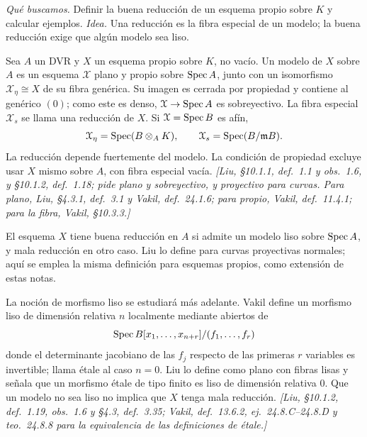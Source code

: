 \emph{Qué buscamos.} Definir la buena reducción de un esquema propio sobre $K$ y calcular ejemplos. \emph{Idea.} Una reducción es la fibra especial de un modelo; la buena reducción exige que algún modelo sea liso.

\begin{defi}
\label{defi:s09-modelo}
Sea $A$ un DVR y $X$ un esquema propio sobre $K$, no vacío. Un modelo de $X$ sobre $A$ es un esquema $\mathcal X$ plano y propio sobre $\operatorname{Spec} A$, junto con un isomorfismo $\mathcal X_\eta\cong X$ de su fibra genérica. Su imagen es cerrada por propiedad y contiene al genérico $(0)$; como este es denso, $\mathcal X\to\operatorname{Spec} A$ es sobreyectivo. La fibra especial $\mathcal X_s$ se llama una reducción de $X$. Si $\mathcal X=\operatorname{Spec} B$ es afín,
\[
\mathcal X_\eta=\operatorname{Spec}(B\otimes_AK),\qquad
\mathcal X_s=\operatorname{Spec}(B/\mathfrak mB).
\]
La reducción depende fuertemente del modelo. La condición de propiedad excluye usar $X$ mismo sobre $A$, con fibra especial vacía. \emph{[Liu, \S10.1.1, def.~1.1 y obs.~1.6, y \S10.1.2, def.~1.18; pide plano y sobreyectivo, y proyectivo para curvas. Para plano, Liu, \S4.3.1, def.~3.1 y Vakil, def.~24.1.6; para propio, Vakil, def.~11.4.1; para la fibra, Vakil, \S10.3.3.]}
\end{defi}

\begin{defi}
\label{defi:s09-buena-reduccion}
El esquema $X$ tiene buena reducción en $A$ si admite un modelo liso sobre $\operatorname{Spec} A$, y mala reducción en otro caso. Liu lo define para curvas proyectivas normales; aquí se emplea la misma definición para esquemas propios, como extensión de estas notas.

La noción de morfismo liso se estudiará más adelante. Vakil define un morfismo liso de dimensión relativa $n$ localmente mediante abiertos de
\[
\operatorname{Spec} B[x_1,\ldots,x_{n+r}]/(f_1,\ldots,f_r)
\]
donde el determinante jacobiano de las $f_j$ respecto de las primeras $r$ variables es invertible; llama étale al caso $n=0$. Liu lo define como plano con fibras lisas y señala que un morfismo étale de tipo finito es liso de dimensión relativa $0$. Que un modelo no sea liso no implica que $X$ tenga mala reducción. \emph{[Liu, \S10.1.2, def.~1.19, obs.~1.6 y \S4.3, def.~3.35; Vakil, def.~13.6.2, ej.~24.8.C--24.8.D y teo.~24.8.8 para la equivalencia de las definiciones de étale.]}
\end{defi}

